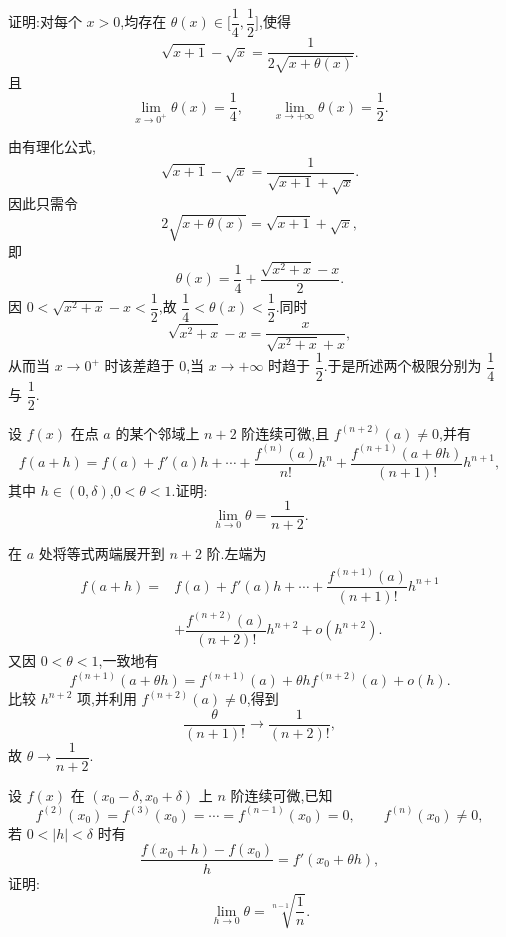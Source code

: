 \begin{example}
    证明:对每个 $x>0$,均存在 $\theta(x)\in\lbrack \dfrac{1}{4},\dfrac{1}{2}\rbrack$,使得
    \[
        \sqrt{x+1}-\sqrt{x}=\dfrac{1}{2\sqrt{x+\theta(x)}}.
    \]
    且
    \[
        \lim\limits_{x\to0^+}\theta(x)=\dfrac{1}{4},
        \qquad
        \lim\limits_{x\to+\infty}\theta(x)=\dfrac{1}{2}.
    \]
\end{example}
\exampleblank

\begin{solution}
    由有理化公式,
    \[
        \sqrt{x+1}-\sqrt{x}
        =\dfrac{1}{\sqrt{x+1}+\sqrt{x}}.
    \]
    因此只需令
    \[
        2\sqrt{x+\theta(x)}=\sqrt{x+1}+\sqrt{x},
    \]
    即
    \[
        \theta(x)=\dfrac{1}{4}
        +\dfrac{\sqrt{x^2+x}-x}{2}.
    \]
    因 $0<\sqrt{x^2+x}-x<\dfrac{1}{2}$,故 $\dfrac{1}{4}<\theta(x)<\dfrac{1}{2}$.同时
    \[
        \sqrt{x^2+x}-x
        =\dfrac{x}{\sqrt{x^2+x}+x},
    \]
    从而当 $x\to0^+$ 时该差趋于 $0$,当 $x\to+\infty$ 时趋于 $\dfrac{1}{2}$.于是所述两个极限分别为 $\dfrac{1}{4}$ 与 $\dfrac{1}{2}$.
\end{solution}

\begin{example}
    设 $f(x)$ 在点 $a$ 的某个邻域上 $n+2$ 阶连续可微,且 $f^{(n+2)}(a)\neq0$,并有
    \[
        f(a+h)=f(a)+f'(a)h+\cdots+\dfrac{f^{(n)}(a)}{n!}h^n
        +\dfrac{f^{(n+1)}(a+\theta h)}{(n+1)!}h^{n+1},
    \]
    其中 $h\in(0,\delta)$,$0<\theta<1$.证明:
    \[
        \lim\limits_{h\to0}\theta=\dfrac{1}{n+2}.
    \]
\end{example}
\exampleblank

\begin{solution}
    在 $a$ 处将等式两端展开到 $n+2$ 阶.左端为
    \[
        \begin{aligned}
            f(a+h)={} & f(a)+f'(a)h+\cdots
            +\dfrac{f^{(n+1)}(a)}{(n+1)!}h^{n+1}                         \\
                      & +\dfrac{f^{(n+2)}(a)}{(n+2)!}h^{n+2}+o(h^{n+2}).
        \end{aligned}
    \]
    又因 $0<\theta<1$,一致地有
    \[
        f^{(n+1)}(a+\theta h)
        =f^{(n+1)}(a)+\theta h f^{(n+2)}(a)+o(h).
    \]
    比较 $h^{n+2}$ 项,并利用 $f^{(n+2)}(a)\neq0$,得到
    \[
        \dfrac{\theta}{(n+1)!}\longrightarrow\dfrac{1}{(n+2)!},
    \]
    故 $\theta\to\dfrac{1}{n+2}$.
\end{solution}

\begin{example}
    设 $f(x)$ 在 $(x_0-\delta,x_0+\delta)$ 上 $n$ 阶连续可微,已知
    \[
        f^{(2)}(x_0)=f^{(3)}(x_0)=\cdots=f^{(n-1)}(x_0)=0,
        \qquad f^{(n)}(x_0)\neq0,
    \]
    若 $0<|h|<\delta$ 时有
    \[
        \dfrac{f(x_0+h)-f(x_0)}{h}=f'(x_0+\theta h),
    \]
    证明:
    \[
        \lim\limits_{h\to0}\theta
        =\sqrt[n-1]{\dfrac{1}{n}}.
    \]
\end{example}
\exampleblank

